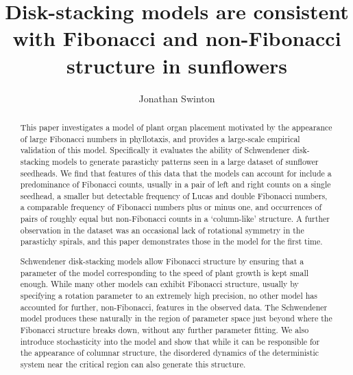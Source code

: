 \documentclass[a4paper,10pt]{amsart}
\begin{document}
\title[Disk-stacking models]{Disk-stacking models are consistent with Fibonacci and non-Fibonacci structure in sunflowers} 
\author{Jonathan Swinton}
\address{ORCID 0000-0002-3196-9653}




\begin{abstract}
This paper investigates a model of plant organ placement motivated by the appearance of large Fibonacci numbers in phyllotaxis, and provides a large-scale empirical validation of this model. Specifically it evaluates the ability of Schwendener disk-stacking models to generate parastichy patterns seen in a large dataset of sunflower seedheads. We find that features of this data that the models can account for include a predominance of Fibonacci counts, usually in a pair of left and right counts on a single seedhead, a smaller but detectable frequency of Lucas and double Fibonacci numbers, a comparable frequency of Fibonacci numbers plus or minus one, and occurrences of pairs of roughly equal but non-Fibonacci counts in a `column-like' structure. A further observation in the dataset was an occasional lack of rotational symmetry in the parastichy spirals, and this paper demonstrates those in the model for the first time.

 Schwendener disk-stacking models allow Fibonacci structure by ensuring that a parameter of the model corresponding to the speed of plant growth is kept small enough. While many other models can exhibit Fibonacci structure, usually by specifying a rotation parameter to an extremely high precision, no other model has accounted for further, non-Fibonacci, features in the observed data.  The Schwendener model produces these naturally in the region of parameter space just beyond where the Fibonacci structure breaks down, without any further parameter fitting. We also introduce stochasticity into the model and show that while it can be responsible for the appearance of columnar structure, the disordered dynamics of the deterministic system near the critical region can also generate this structure. 

\end{abstract}
\maketitle 

\end{document}
